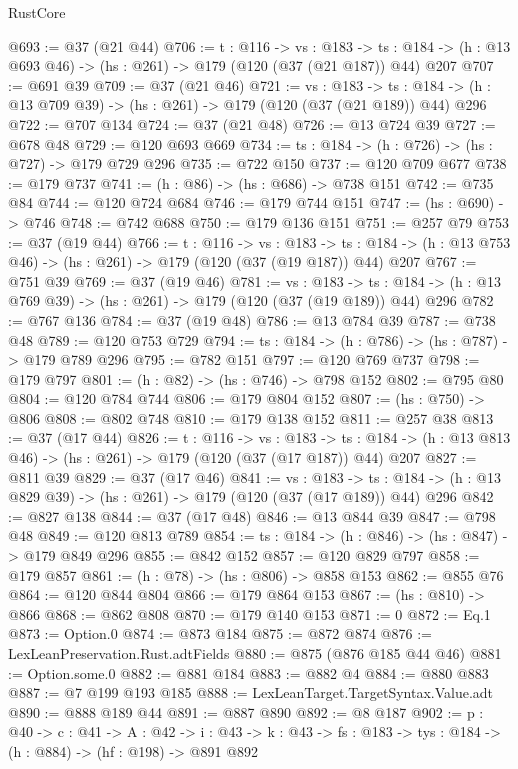 \begin{lexlean}{RustCore}
\begin{coremodule}
@693 := @37 (@21 @44)
@706 := {t : @116} ->
  {vs : @183} ->
  {ts : @184} -> (h : @13 @693 @46) -> (hs : @261) -> @179 (@120 (@37 (@21 @187)) @44) @207
@707 := @691 @39
@709 := @37 (@21 @46)
@721 := {vs : @183} ->
  {ts : @184} -> (h : @13 @709 @39) -> (hs : @261) -> @179 (@120 (@37 (@21 @189)) @44) @296
@722 := @707 @134
@724 := @37 (@21 @48)
@726 := @13 @724 @39
@727 := @678 @48
@729 := @120 @693 @669
@734 := {ts : @184} -> (h : @726) -> (hs : @727) -> @179 @729 @296
@735 := @722 @150
@737 := @120 @709 @677
@738 := @179 @737
@741 := (h : @86) -> (hs : @686) -> @738 @151
@742 := @735 @84
@744 := @120 @724 @684
@746 := @179 @744 @151
@747 := (hs : @690) -> @746
@748 := @742 @688
@750 := @179 @136 @151
@751 := @257 @79
@753 := @37 (@19 @44)
@766 := {t : @116} ->
  {vs : @183} ->
  {ts : @184} -> (h : @13 @753 @46) -> (hs : @261) -> @179 (@120 (@37 (@19 @187)) @44) @207
@767 := @751 @39
@769 := @37 (@19 @46)
@781 := {vs : @183} ->
  {ts : @184} -> (h : @13 @769 @39) -> (hs : @261) -> @179 (@120 (@37 (@19 @189)) @44) @296
@782 := @767 @136
@784 := @37 (@19 @48)
@786 := @13 @784 @39
@787 := @738 @48
@789 := @120 @753 @729
@794 := {ts : @184} -> (h : @786) -> (hs : @787) -> @179 @789 @296
@795 := @782 @151
@797 := @120 @769 @737
@798 := @179 @797
@801 := (h : @82) -> (hs : @746) -> @798 @152
@802 := @795 @80
@804 := @120 @784 @744
@806 := @179 @804 @152
@807 := (hs : @750) -> @806
@808 := @802 @748
@810 := @179 @138 @152
@811 := @257 @38
@813 := @37 (@17 @44)
@826 := {t : @116} ->
  {vs : @183} ->
  {ts : @184} -> (h : @13 @813 @46) -> (hs : @261) -> @179 (@120 (@37 (@17 @187)) @44) @207
@827 := @811 @39
@829 := @37 (@17 @46)
@841 := {vs : @183} ->
  {ts : @184} -> (h : @13 @829 @39) -> (hs : @261) -> @179 (@120 (@37 (@17 @189)) @44) @296
@842 := @827 @138
@844 := @37 (@17 @48)
@846 := @13 @844 @39
@847 := @798 @48
@849 := @120 @813 @789
@854 := {ts : @184} -> (h : @846) -> (hs : @847) -> @179 @849 @296
@855 := @842 @152
@857 := @120 @829 @797
@858 := @179 @857
@861 := (h : @78) -> (hs : @806) -> @858 @153
@862 := @855 @76
@864 := @120 @844 @804
@866 := @179 @864 @153
@867 := (hs : @810) -> @866
@868 := @862 @808
@870 := @179 @140 @153
@871 := 0
@872 := Eq.{1}
@873 := Option.{0}
@874 := @873 @184
@875 := @872 @874
@876 := LexLeanPreservation.Rust.adtFields
@880 := @875 (@876 @185 @44 @46)
@881 := Option.some.{0}
@882 := @881 @184
@883 := @882 @4
@884 := @880 @883
@887 := @7 @199 @193 @185
@888 := LexLeanTarget.TargetSyntax.Value.adt
@890 := @888 @189 @44
@891 := @887 @890
@892 := @8 @187
@902 := {p : @40} ->
  {c : @41} ->
  {A : @42} ->
  {i : @43} -> {k : @43} -> {fs : @183} -> {tys : @184} -> (h : @884) -> (hf : @198) -> @891 @892

\end{coremodule}
\end{lexlean}

